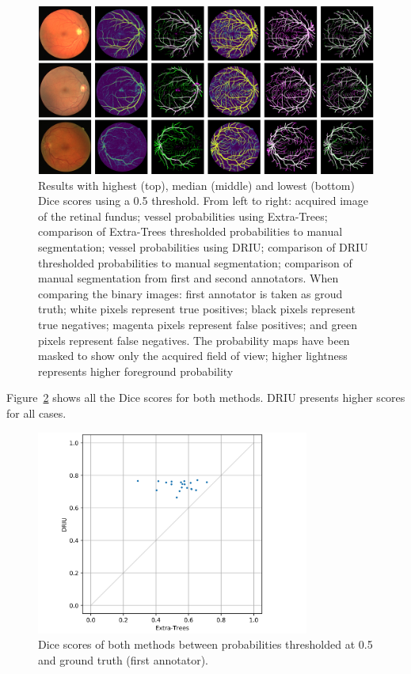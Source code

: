 \begin{figure}
  \includegraphics[width=\textwidth]{figures/collage}
  \caption{Results with highest (top), median (middle) and lowest (bottom) Dice scores using a 0.5 threshold. From left to right: acquired image of the retinal fundus; vessel probabilities using Extra-Trees; comparison of Extra-Trees thresholded probabilities to manual segmentation; vessel probabilities using DRIU; comparison of DRIU thresholded probabilities to manual segmentation; comparison of manual segmentation from first and second annotators. When comparing the binary images: first annotator is taken as groud truth; white pixels represent true positives; black pixels represent true negatives; magenta pixels represent false positives; and green pixels represent false negatives. The probability maps have been masked to show only the acquired field of view; higher lightness represents higher foreground probability} \label{fig:collage}
\end{figure}

Figure~\ref{fig:dice} shows all the Dice scores for both methods. DRIU presents higher scores for all cases.

\begin{figure}
  \centering
  \includegraphics[width=0.8\textwidth]{figures/dices}
  \caption{Dice scores of both methods between probabilities thresholded at 0.5 and ground truth (first annotator).} \label{fig:dice}
\end{figure}

